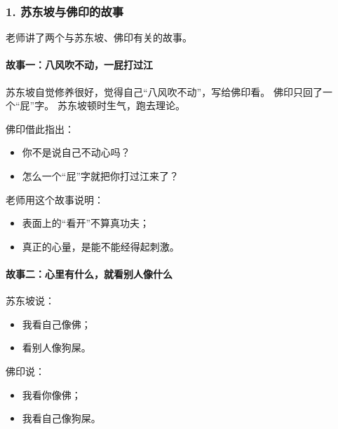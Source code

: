 \documentclass[
  chinese,
  9pt,
  a4paper,
]{ctexart}
\providecommand{\tightlist}{%
  \setlength{\itemsep}{0pt}\setlength{\parskip}{0pt}}
\begin{document}
\subsubsection{1.
苏东坡与佛印的故事}\label{ux82cfux4e1cux5761ux4e0eux4f5bux5370ux7684ux6545ux4e8b}

老师讲了两个与苏东坡、佛印有关的故事。

\paragraph{故事一：八风吹不动，一屁打过江}\label{ux6545ux4e8bux4e00ux516bux98ceux5439ux4e0dux52a8ux4e00ux5c41ux6253ux8fc7ux6c5f}

苏东坡自觉修养很好，觉得自己``八风吹不动''，写给佛印看。
佛印只回了一个``屁''字。 苏东坡顿时生气，跑去理论。

佛印借此指出：

\begin{itemize}
\tightlist
\item
  你不是说自己不动心吗？
\item
  怎么一个``屁''字就把你打过江来了？
\end{itemize}

老师用这个故事说明：

\begin{itemize}
\tightlist
\item
  表面上的``看开''不算真功夫；
\item
  真正的心量，是能不能经得起刺激。
\end{itemize}

\paragraph{故事二：心里有什么，就看别人像什么}\label{ux6545ux4e8bux4e8cux5fc3ux91ccux6709ux4ec0ux4e48ux5c31ux770bux522bux4ebaux50cfux4ec0ux4e48}

苏东坡说：

\begin{itemize}
\tightlist
\item
  我看自己像佛；
\item
  看别人像狗屎。
\end{itemize}

佛印说：

\begin{itemize}
\tightlist
\item
  我看你像佛；
\item
  我看自己像狗屎。
\end{itemize}
\end{document}
